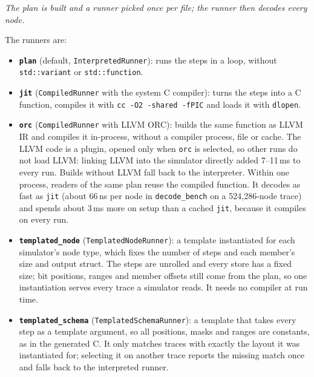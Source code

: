 \documentclass[10pt,a4paper]{article}
\begin{document}
\begin{center}
\resizebox{\linewidth}{!}{}
\par\nopagebreak\small\itshape The plan is built and a runner picked once per file; the runner then decodes every node.
\end{center}

The runners are:

\begin{itemize}
\item \textbf{\texttt{plan}} (default, \texttt{InterpretedRunner}): runs the steps in a loop, without \texttt{std::\allowbreak{}variant} or \texttt{std::\allowbreak{}function}.
\item \textbf{\texttt{jit}} (\texttt{CompiledRunner} with the system C compiler): turns the steps into a C function, compiles it with \texttt{cc -\allowbreak{}O2 -\allowbreak{}shared -\allowbreak{}fPIC} and loads it with \texttt{dlopen}.
\item \textbf{\texttt{orc}} (\texttt{CompiledRunner} with LLVM ORC): builds the same function as LLVM IR and compiles it in-process, without a compiler process, file or cache. The LLVM code is a plugin, opened only when \texttt{orc} is selected, so other runs do not load LLVM: linking LLVM into the simulator directly added 7--11\,ms to every run. Builds without LLVM fall back to the interpreter. Within one process, readers of the same plan reuse the compiled function. It decodes as fast as \texttt{jit} (about 66\,ns per node in \texttt{decode\_\allowbreak{}bench} on a 524,286-node trace) and spends about 3\,ms more on setup than a cached \texttt{jit}, because it compiles on every run.
\item \textbf{\texttt{templated\_node}} (\texttt{TemplatedNodeRunner}): a template instantiated for each simulator's node type, which fixes the number of steps and each member's size and output struct. The steps are unrolled and every store has a fixed size; bit positions, ranges and member offsets still come from the plan, so one instantiation serves every trace a simulator reads. It needs no compiler at run time.
\item \textbf{\texttt{templated\_schema}} (\texttt{TemplatedSchemaRunner}): a template that takes every step as a template argument, so all positions, masks and ranges are constants, as in the generated C. It only matches traces with exactly the layout it was instantiated for; selecting it on another trace reports the missing match once and falls back to the interpreted runner.
\end{itemize}
\end{document}
